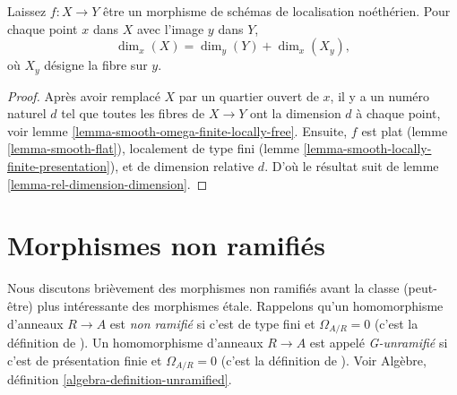 \begin{lemma}

\label{lemma-smoothness-dimension}
Laissez $f : X \to Y$ être un morphisme de schémas de localisation noéthérien. Pour chaque point $x$ dans $X$ avec l'image $y$ dans $Y$, $$
\dim_x(X) = \dim_y(Y) + \dim_x(X_y),
$$ où $X_y$ désigne la fibre sur $y$.
\end{lemma}

\begin{proof}
Après avoir remplacé $X$ par un quartier ouvert de $x$, il y a un numéro naturel $d$ tel que toutes les fibres de $X \to Y$ ont la dimension $d$ à chaque point, voir lemme \ref{lemma-smooth-omega-finite-locally-free}. Ensuite, $f$ est plat (lemme \ref{lemma-smooth-flat}), localement de type fini (lemme \ref{lemma-smooth-locally-finite-presentation}), et de dimension relative $d$. D'où le résultat suit de lemme \ref{lemma-rel-dimension-dimension}.
\end{proof}












\section{Morphismes non ramifiés}
\label{section-unramified}

\noindent
Nous discutons brièvement des morphismes non ramifiés avant la classe (peut-être) plus intéressante des morphismes \'etale. Rappelons qu'un homomorphisme d'anneaux $R \to A$ est {\it non ramifié} si c'est de type fini et $\Omega_{A/R} = 0$ (c'est la définition de \cite{Henselian}). Un homomorphisme d'anneaux $R \to A$ est appelé {\it G-unramifié} si c'est de présentation finie et $\Omega_{A/R} = 0$ (c'est la définition de \cite{EGA}). Voir Algèbre, définition \ref{algebra-definition-unramified}.

